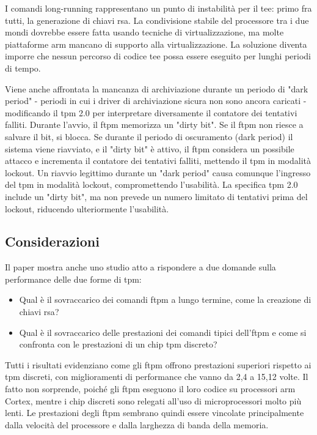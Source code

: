 I comandi long-running rappresentano un punto di instabilità per il \acrshort{tee}: primo fra tutti, la generazione di chiavi \acrshort{rsa}. La condivisione stabile del processore tra i due mondi dovrebbe essere fatta usando tecniche di virtualizzazione, ma molte piattaforme \acrshort{arm} mancano di supporto alla virtualizzazione. La soluzione diventa imporre che nessun percorso di codice \acrshort{tee} possa essere eseguito per lunghi periodi di tempo.

Viene anche affrontata la mancanza di archiviazione durante un periodo di "dark period" - periodi in cui i driver di archiviazione sicura non sono ancora caricati - modificando il \acrshort{tpm} 2.0 per interpretare diversamente il contatore dei tentativi falliti. Durante l'avvio, il \acrshort{ftpm} memorizza un "dirty bit". Se il \acrshort{ftpm} non riesce a salvare il bit, si blocca. Se durante il periodo di oscuramento (dark period) il sistema viene riavviato, e il "dirty bit" è attivo, il \acrshort{ftpm} considera un possibile attacco e incrementa il contatore dei tentativi falliti, mettendo il \acrshort{tpm} in modalità lockout. Un riavvio legittimo durante un "dark period" causa comunque l'ingresso del \acrshort{tpm} in modalità lockout, compromettendo l'usabilità. La specifica \acrshort{tpm} 2.0 include un "dirty bit", ma non prevede un numero limitato di tentativi prima del lockout, riducendo ulteriormente l'usabilità.

\subsection{Considerazioni}\label{subsec:considerazioni_ftpm}

Il paper mostra anche uno studio atto a rispondere a due domande sulla performance delle due forme di \acrshort{tpm}:
\begin{itemize}
    \item Qual è il sovraccarico dei comandi \acrshort{ftpm} a lungo termine, come la creazione di chiavi \acrshort{rsa}?
    \item Qual è il sovraccarico delle prestazioni dei comandi tipici dell'\acrshort{ftpm} e come si confronta con le prestazioni di un chip \acrshort{tpm} discreto?
\end{itemize}

Tutti i risultati evidenziano come gli \acrshort{ftpm} offrono prestazioni superiori rispetto ai \acrshort{tpm} discreti, con miglioramenti di performance che vanno da 2,4 a 15,12 volte. Il fatto non sorprende, poiché gli \acrshort{ftpm} eseguono il loro codice su processori \acrshort{arm} Cortex, mentre i chip discreti sono relegati all'uso di microprocessori molto più lenti. Le prestazioni degli \acrshort{ftpm} sembrano quindi essere vincolate principalmente dalla velocità del processore e dalla larghezza di banda della memoria.

